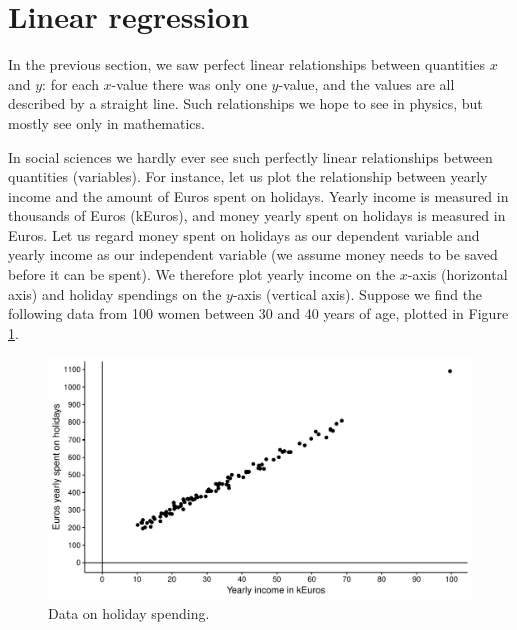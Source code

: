 \documentclass[]{book}\usepackage[]{graphicx}\usepackage[]{color}
\makeatletter
\def\maxwidth{ %
  \ifdim\Gin@nat@width>\linewidth
    \linewidth
  \else
    \Gin@nat@width
  \fi
}
\newenvironment{knitrout}{}{} %
\makeatother
\begin{document}
\section{Linear regression}

In the previous section, we saw perfect linear relationships between quantities $x$ and $y$: for each $x$-value there was only one $y$-value, and the values are all described by a straight line. Such relationships we hope to see in physics, but mostly see only in mathematics.

In social sciences we hardly ever see such perfectly linear relationships between quantities (variables). For instance, let us plot the relationship between yearly income and the amount of Euros spent on holidays. Yearly income is measured in thousands of Euros (kEuros), and money yearly spent on holidays is measured in Euros. Let us regard money spent on holidays as our dependent variable and yearly income as our independent variable (we assume money needs to be saved before it can be spent). We therefore plot yearly income on the $x$-axis (horizontal axis) and holiday spendings on the $y$-axis (vertical axis). Suppose we find the following data from 100 women between 30 and 40 years of age, plotted in Figure \ref{fig:lm_8}.


\begin{knitrout}
\color{fgcolor}\begin{figure}

{\centering \includegraphics[width=\maxwidth]{figure/lm_8-1} 

}

\caption[Data on holiday spending]{Data on holiday spending.}\label{fig:lm_8}
\end{figure}


\end{knitrout}
\end{document}
